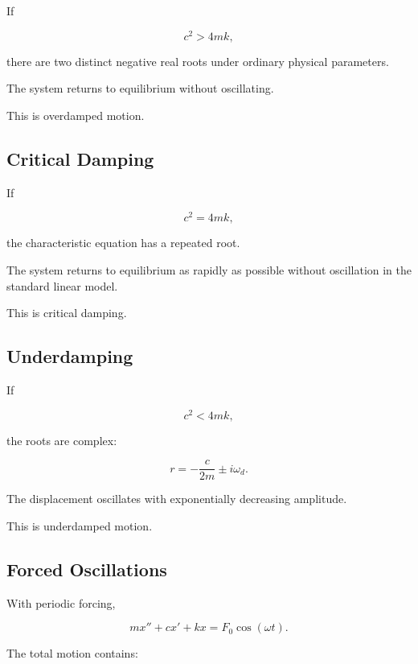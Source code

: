 If

\[
\boxed{
c^2>4mk,
}
\]

there are two distinct negative real roots under ordinary physical
parameters.

The system returns to equilibrium without oscillating.

This is overdamped motion.

\subsection{Critical Damping}
\label{subsec:critical-damping}

If

\[
\boxed{
c^2=4mk,
}
\]

the characteristic equation has a repeated root.

The system returns to equilibrium as rapidly as possible without
oscillation in the standard linear model.

This is critical damping.

\subsection{Underdamping}
\label{subsec:underdamping}

If

\[
\boxed{
c^2<4mk,
}
\]

the roots are complex:

\[
\boxed{
r
=
-\frac{c}{2m}
\pm
i\omega_d.
}
\]

The displacement oscillates with exponentially decreasing amplitude.

This is underdamped motion.

\subsection{Forced Oscillations}
\label{subsec:forced-oscillations}

With periodic forcing,

\[
\boxed{
mx''
+
cx'
+
kx
=
F_0\cos(\omega t).
}
\]

The total motion contains:

